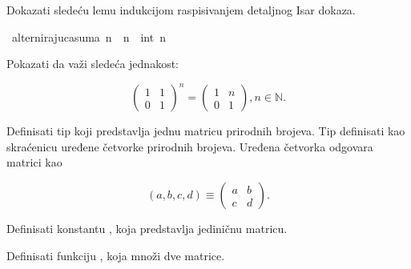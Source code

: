 \begin{isabellebody}
\begin{exercise}[subtitle=Alternirajuća suma neparnih prirodnih brojeva]
\isadelimproof
%
\endisadelimproof
%
\isatagproof
%
\endisatagproof
{\isafoldproof}%
%
\isadelimproof
%
\endisadelimproof
%
\begin{isamarkuptext}%
Dokazati sledeću lemu indukcijom raspisivanjem detaljnog Isar dokaza.%
\end{isamarkuptext}\isamarkuptrue%
\isamarkupfalse%
\ {\isachardoublequoteopen}alternirajuca{\isacharunderscore}{\kern0pt}suma\ n\ {\isacharequal}{\kern0pt}\ {\isacharparenleft}{\kern0pt}{\isacharminus}{\kern0pt}{}{\isacharparenright}{\kern0pt}{\isacharcircum}{\kern0pt}n\ {\isacharasterisk}{\kern0pt}\ int\ n{\isachardoublequoteclose}%
\isadelimproof
%
\endisadelimproof
%
\isatagproof
%
\endisatagproof
{\isafoldproof}%
%
\isadelimproof
%
\endisadelimproof
%
\end{exercise}
%
\begin{exercise}[subtitle=Množenje matrica]
%
\begin{isamarkuptext}%
Pokazati da važi sledeća jednakost:%
\end{isamarkuptext}\isamarkuptrue%
%
$$
\begin{pmatrix}
1 & 1\\
0 & 1
\end{pmatrix}^n
=
\begin{pmatrix}
1 & n\\
0 & 1
\end{pmatrix},
n \in \mathbb{N}.
$$
%
\begin{isamarkuptext}%
Definisati tip  koji predstavlja jednu  matricu prirodnih brojeva.
      Tip  definisati kao skraćenicu uređene četvorke prirodnih brojeva.
      Uređena četvorka odgovara  matrici kao%
\end{isamarkuptext}\isamarkuptrue%
%
$$
(a, b, c, d) \equiv
\begin{pmatrix}
a & b\\
c & d
\end{pmatrix}.
$$
%
\begin{isamarkuptext}%
Definisati konstantu , koja predstavlja jediničnu matricu.%
\end{isamarkuptext}\isamarkuptrue%
%
\begin{isamarkuptext}%
Definisati funkciju , koja množi dve matrice.%

\end{isamarkuptext}
\end{exercise}
\end{isabellebody}
